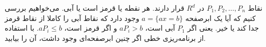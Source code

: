 نقاط
$P_1, P_2, \ldots, P_n$
در 
$R^d$
قرار دارند. هر نقطه یا قرمز است یا آبی. می‌خواهیم بررسی کنیم که آیا یک ابرصفحه
$a = \{ax = b\}$
وجود دارد که نقاط آبی را کاملا از نقاط قرمز جدا کند یا خیر. یعنی اگر
$P_1$
آبی است،
$a P_i > b$
و اگر قرمز است،
$a P_i \leq b$.
با استفاده از برنامه‌ریزی خطی اگر چنین ابرصفحه‌ای وجود داشت، آن را بیابید.